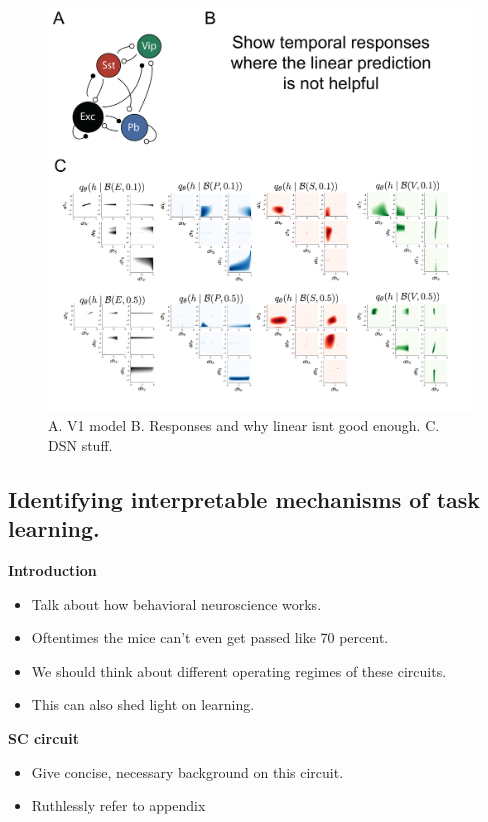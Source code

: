 \documentclass[11pt]{article}
\begin{document}
\begin{figure}
\begin{center}
\includegraphics[scale=0.4]{figs/fig3/fig3.pdf}
\end{center}
\caption{A. V1 model B. Responses and why linear isnt good enough. C. DSN stuff.}
\end{figure}

\subsection{Identifying interpretable mechanisms of task learning.}
\textbf{Introduction}
\begin{itemize}
\item Talk about how behavioral neuroscience works.
\item Oftentimes the mice can't even get passed like 70 percent.
\item We should think about different operating regimes of these circuits.
\item This can also shed light on learning.
\end{itemize}

\textbf{SC circuit}
\begin{itemize}
\item Give concise, necessary background on this circuit.
\item Ruthlessly refer to appendix
\end{itemize}
\end{document}
